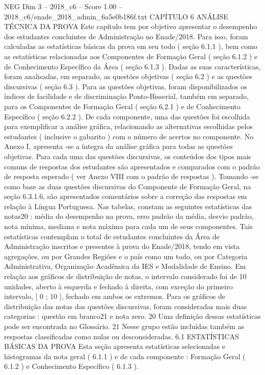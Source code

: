 \begin{textsample}{NEG Dim 3 – 2018\_c6 – Score 1.00 – 2018\_c6/enade\_2018\_admin\_6a5e0b186f.txt}  \label{ex:f3_neg_169}
CAPÍTULO 6 ANÁLISE TÉCNICA DA PROVA Este capítulo tem por objetivo apresentar o desempenho dos estudantes concluintes de Administração no Enade/2018.
Para isso, foram calculadas as estatísticas básicas da prova em seu todo ( seção 6.1.1 ), bem como as estatísticas relacionadas aos Componentes de Formação Geral ( seção 6.1.2 ) e de Conhecimento Específico da Área ( seção 6.1.3 ).
Dadas as suas características, foram analisadas, em separado, as questões objetivas ( seção 6.2 ) e as questões discursivas ( seção 6.3 ).
Para as questões objetivas, foram disponibilizados os índices de facilidade e de discriminação Ponto-Bisserial, também em separado, para os Componentes de Formação Geral ( seção 6.2.1 ) e de Conhecimento Específico ( seção 6.2.2 ).
De cada componente, uma das questões foi escolhida para exemplificar a análise gráfica, relacionando as alternativas escolhidas pelos estudantes ( inclusive o gabarito ) com o número de acertos no componente.
No Anexo I, apresenta -se a íntegra da análise gráfica para todas as questões objetivas.
Para cada uma das questões discursivas, os conteúdos dos tipos mais comuns de respostas dos estudantes são apresentados e comparados com o padrão de resposta esperado ( ver Anexo VIII com o padrão de respostas ).
Tomando -se como base as duas questões discursivas do Componente de Formação Geral, na seção 6.3.1.6, são apresentados comentários sobre a correção das respostas em relação à Língua Portuguesa.
Nas tabelas, constam as seguintes estatísticas das notas20 : média do desempenho na prova, erro padrão da média, desvio padrão, nota mínima, mediana e nota máxima para cada um de seus componentes.
Tais estatísticas contemplam o total de estudantes concluintes da Área de Administração inscritos e presentes à prova do Enade/2018, tendo em vista agregações, ou por Grandes Regiões e o país como um todo, ou por Categoria Administrativa, Organização Acadêmica da IES e Modalidade de Ensino.
Em relação aos gráficos de distribuição de notas, o intervalo considerado foi de 10 unidades, aberto à esquerda e fechado à direita, com exceção do primeiro intervalo, [ 0 ; 10 ], fechado em ambos os extremos.
Para os gráficos de distribuição das notas das questões discursivas, foram consideradas mais duas categorias : questão em branco21 e nota zero. 20 Uma definição dessas estatísticas pode ser encontrada no Glossário. 21 Nesse grupo estão incluídas também as respostas classificadas como nulas ou desconsideradas. 6.1 ESTATÍSTICAS BÁSICAS DA PROVA Esta seção apresenta estatísticas selecionadas e histogramas da nota geral ( 6.1.1 ) e de cada componente : Formação Geral ( 6.1.2 ) e Conhecimento Específico ( 6.1.3 ).

\end{textsample}
